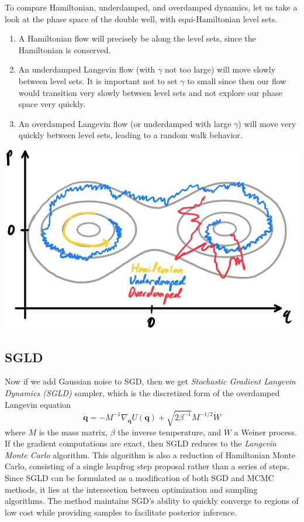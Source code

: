     To compare Hamiltonian, underdamped, and overdamped dynamics, let us take a look at the phase space of the double well, with equi-Hamiltonian level sets. 
    \begin{enumerate}
      \item A Hamiltonian flow will precisely be along the level sets, since the Hamiltonian is conserved. 
      \item An underdamped Langevin flow (with $\gamma$ not too large) will move slowly between level sets. It is important not to set $\gamma$ to small since then our flow would transition very slowly between level sets and not explore our phase space very quickly. 
      \item An overdamped Langevin flow (or underdamped with large $\gamma$) will move very quickly between level sets, leading to a random walk behavior. 
    \end{enumerate}
    \begin{center}
      \includegraphics[scale=0.25]{img/phase_space.jpg}
    \end{center}

  \subsection{SGLD}

    Now if we add Gaussian noise to SGD, then we get \textit{Stochastic Gradient Langevin Dynamics (SGLD)} sampler, which is the discretized form of the overdamped Langevin equation 
    \begin{equation}
      \mathbf{\dot{q}} = - M^{-1} \nabla_\mathbf{q} U(\mathbf{q}) + \sqrt{2 \beta^{-1}} M^{-1/2} \dot{W}
    \end{equation}
    where $M$ is the mass matrix, $\beta$ the inverse temperature, and $\dot{W}$ a Weiner process. If the gradient computations are exact, then SGLD reduces to the \textit{Langevin Monte Carlo} algorithm. This algorithm is also a reduction of Hamiltonian Monte Carlo, consisting of a single leapfrog step proposal rather than a series of steps. Since SGLD can be formulated as a modification of both SGD and MCMC methods, it lies at the intersection between optimization and sampling algorithms. The method maintains SGD's ability to quickly converge to regions of low cost while providing samples to facilitate posterior inference. 


